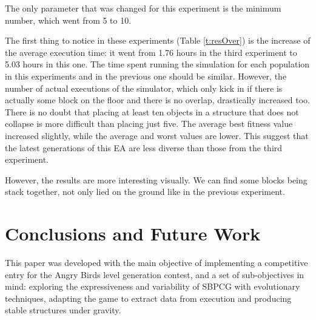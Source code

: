 \documentclass[sigconf]{acmart}
\begin{document}
The only parameter that was changed for this experiment is the minimum
number, which went from 5 to 10. 

The first thing to notice in these experiments (Table \ref{t:resOver}) is the 
increase of the average execution time: it went from 1.76 hours in the third 
experiment to 5.03 hours in this one. The time spent running the simulation for 
each population in this experiments and in the previous one should be similar. 
However, the number of actual executions of the simulator, which only
kick in if there is actually some block on the floor and there is no overlap, drastically increased too. There is no doubt 
that placing at least ten objects in a structure that does not
collapse is more difficult than placing just five. The average 
best fitness value increased slightly, while the average and worst values are lower. This suggest that the latest generations of this EA are less diverse than those 
from the third experiment.

However, the results are more interesting visually. We can find some blocks 
being stack together, not only lied on the ground like in the previous 
experiment. 




%
\section{Conclusions and Future Work} 
\label{sec:conclusions}


This paper was developed with the main objective of implementing a
competitive entry for the Angry Birds level generation contest, and  a
set of sub-objectives in mind: exploring the expressiveness and variability of 
SBPCG with evolutionary techniques, adapting the game to extract data from 
execution and producing stable structures under gravity.
\end{document}
